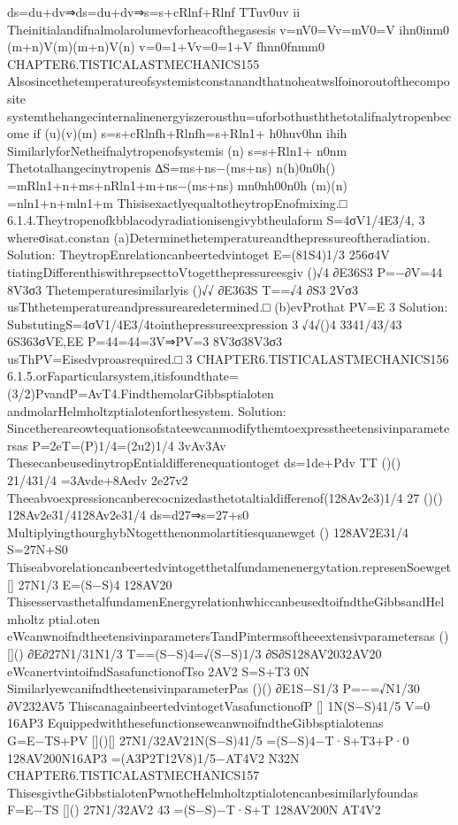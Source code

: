 {{{{{{{{{{ds=du+dv⇒ds=du+dv⇒s=s+cRlnf+Rlnf
TTuv0uv
ii
Theinitialandifnalmolarolumevforheacofthegasesis
v=nV0=Vv=mV0=V
ihn0inm0
(m+n)V(m)(m+n)V(n)
v=0=1+Vv=0=1+V
fhnn0fnmm0
CHAPTER6.TISTICALASTMECHANICS155
Alsosincethetemperatureofsystemistconstanandthatnoheatwslfoinoroutofthecomposite
systemthehangecinternalinenergyiszerousthu=uforbothusththetotalifnalytropenbecome
if
(u)(v)(m)
s=s+cRlnfh+Rlnfh=s+Rln1+
h0huv0hn
ihih
SimilarlyforNetheifnalytropenofsystemis
(n)
s=s+Rln1+
n0nm
Thetotalhangecinytropenis
∆S=ms+ns−(ms+ns)
n(h)0n0h()
=mRln1+n+ms+nRln1+m+ns−(ms+ns)
mn0nh00n0h
(m)(n)
=nln1+n+mln1+m
ThisisexactlyequaltotheytropEnofmixing.□
6.1.4.Theytropenofkbblacodyradiationisengivybtheulaform
S=4σV1/4E3/4,
3
whereσisat.constan
(a)Determinethetemperatureandthepressureoftheradiation.
Solution:
TheytropEnrelationcanbeertedvintoget
E=(81S4)1/3
256σ4V
tiatingDifferenthiswithrepsecttoVtogetthepressureesgiv
()√4
∂E36S3
P=−∂V=44
8V3σ3
Thetemperaturesimilarlyis
()√√
∂E363S
T==√4
∂S3
2Vσ3
usThthetemperatureandpressurearedetermined.□
(b)evProthat
PV=E
3
Solution:
SubstutingS=4σV1/4E3/4tointhepressureexpression
3
√4√()4
3341/43/43
6S363σVE,EE
P=44=44=3V⇒PV=3
8V3σ38V3σ3
usThPV=Eisedvproasrequired.□
3
CHAPTER6.TISTICALASTMECHANICS156
6.1.5.orFaparticularsystem,itisfoundthate=(3/2)PvandP=AvT4.FindthemolarGibbsptialoten
andmolarHelmholtzptialotenforthesystem.
Solution:
Sincethereareowtequationsofstateewcanmodifythemtoexpresstheetensivinparametersas
P=2eT=(P)1/4=(2u2)1/4
3vAv3Av
ThesecanbeusedinytropEntialdifferenequationtoget
ds=1de+Pdv
TT
()()
21/431/4
=3Avde+8Aedv
2e27v2
Theeabvoexpressioncanberecocnizedasthetotaltialdifferenof(128Av2e3)1/4
27
()()
128Av2e31/4128Av2e31/4
ds=d27⇒s=27+s0
MultiplyingthourghybNtogetthenonmolartitiesquanewget
()
128AV2E31/4
S=27N+S0
Thiseabvorelationcanbeertedvintogetthetalfundamenenergytation.represenSoewget
[]
27N1/3
E=(S−S)4
128AV20
ThisesservasthetalfundamenEnergyrelationhwhiccanbeusedtoifndtheGibbsandHelmholtz
ptial.oten
eWcanwnoifndtheetensivinparametersTandPintermsoftheeextensivparametersas
()[]()
∂E∂27N1/31N1/3
T==(S−S)4=√(S−S)1/3
∂S∂S128AV2032AV20
eWcanertvintoifndSasafunctionofTso
2AV2
S=S+T3
0N
SimilarlyewcanifndtheetensivinparameterPas
()()
∂E1S−S1/3
P=−=√N1/30
∂V232AV5
ThiscanagainbeertedvintogetVasafunctionofP
[]
1N(S−S)41/5
V=0
16AP3
EquippedwiththesefunctionsewcanwnoifndtheGibbsptialotenas
G=E−TS+PV
[]()[]
27N1/32AV21N(S−S)41/5
=(S−S)4−T·S+T3+P·0
128AV200N16AP3
=(A3P2T12V8)1/5−AT4V2
N32N
CHAPTER6.TISTICALASTMECHANICS157
ThisesgivtheGibbstialotenPwnotheHelmholtzptialotencanbesimilarlyfoundas
F=E−TS
[]()
27N1/32AV2
43
=(S−S)−T·S+T
128AV200N
AT4V2
}}}}}}}}}}
